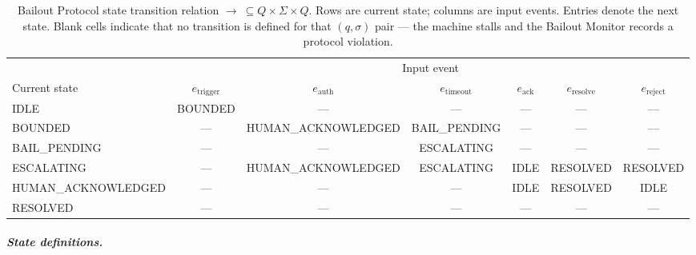 \begin{table}[htbp]
\caption{Bailout Protocol state transition relation $\rightarrow\ \subseteq Q \times \Sigma \times Q$. Rows are current state; columns are input events. Entries denote the next state. Blank cells indicate that no transition is defined for that $(q, \sigma)$ pair — the machine stalls and the Bailout Monitor records a protocol violation.}
\label{tab:bailout-transition}
\begin{tabular}{@{}lcccccc@{}}
\toprule
 & \multicolumn{6}{c}{Input event} \\
\cmidrule(l){2-7}
Current state & $e_{\text{trigger}}$ & $e_{\text{auth}}$ & $e_{\text{timeout}}$ & $e_{\text{ack}}$ & $e_{\text{resolve}}$ & $e_{\text{reject}}$ \\
\midrule
IDLE & BOUNDED & — & — & — & — & — \\
BOUNDED & — & HUMAN\_ACKNOWLEDGED & BAIL\_PENDING & — & — & — \\
BAIL\_PENDING & — & — & ESCALATING & — & — & — \\
ESCALATING & — & HUMAN\_ACKNOWLEDGED & ESCALATING & IDLE & RESOLVED & RESOLVED \\
HUMAN\_ACKNOWLEDGED & — & — & — & IDLE & RESOLVED & IDLE \\
RESOLVED & — & — & — & — & — & — \\
\bottomrule
\end{tabular}
\end{table}

\subparagraph{State definitions.}

